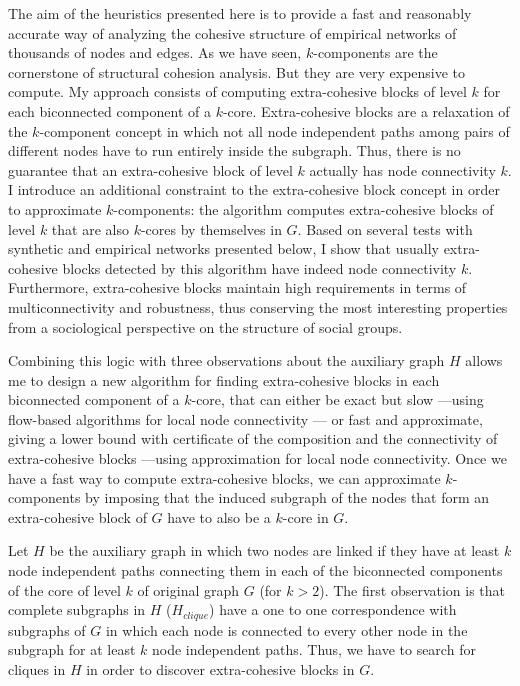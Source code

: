 The aim of the heuristics presented here is to provide a fast and reasonably accurate way of analyzing the cohesive structure of empirical networks of thousands of nodes and edges. As we have seen, $k$-components are the cornerstone of structural cohesion analysis. But they are very expensive to compute. My approach consists of computing extra-cohesive blocks of level $k$ for each biconnected component of a $k$-core. Extra-cohesive blocks are a relaxation of the $k$-component concept in which not all node independent paths among pairs of different nodes have to run entirely inside the subgraph. Thus, there is no guarantee that an extra-cohesive block of level $k$ actually has node connectivity $k$. I introduce an additional constraint to the extra-cohesive block concept in order to approximate $k$-components: the algorithm computes extra-cohesive blocks of level $k$ that are also $k$-cores by themselves in $G$. Based on several tests with synthetic and empirical networks presented below, I show that usually extra-cohesive blocks detected by this algorithm have indeed node connectivity $k$. Furthermore, extra-cohesive blocks maintain high requirements in terms of multiconnectivity and robustness, thus conserving the most interesting properties from a sociological perspective on the structure of social groups.

Combining this logic with three observations about the auxiliary graph $H$ allows me to design a new algorithm for finding extra-cohesive blocks in each biconnected component of a $k$-core, that can either be exact but slow ---using flow-based algorithms for local node connectivity \citep[Chapter 7]{brandes:2005}--- or fast and approximate, giving a lower bound with certificate of the composition and the connectivity of extra-cohesive blocks ---using \citet{white:2001b} approximation for local node connectivity. Once we have a fast way to compute extra-cohesive blocks, we can approximate $k$-components by imposing that the induced subgraph of the nodes that form an extra-cohesive block of $G$ have to also be a $k$-core in $G$.

Let $H$ be the auxiliary graph in which two nodes are linked if they have at least $k$ node independent paths connecting them in each of the biconnected components of the core of level $k$ of original graph $G$ (for $k > 2$). The first observation is that complete subgraphs in $H$ ($H_{clique}$) have a one to one correspondence with subgraphs of $G$ in which each node is connected to every other node in the subgraph for at least $k$ node independent paths. Thus, we have to search for cliques in $H$ in order to discover extra-cohesive blocks in $G$.

